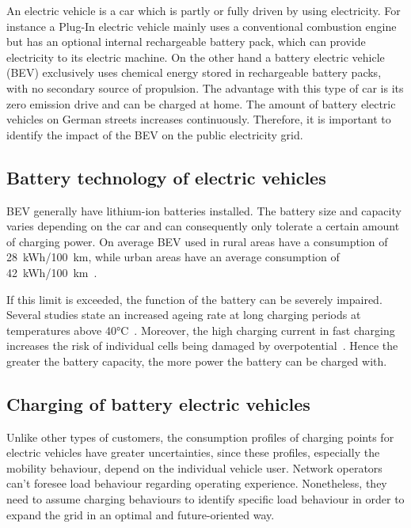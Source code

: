 An electric vehicle is a car which is partly or fully driven by using electricity. For instance a Plug-In electric vehicle mainly uses a conventional combustion engine but has an optional internal rechargeable battery pack, which can provide electricity to its electric machine. On the other hand a battery electric vehicle (BEV) exclusively uses chemical energy stored in rechargeable battery packs, with no secondary source of propulsion. The advantage with this type of car is its zero emission drive and can be charged at home. The amount of battery electric vehicles on German streets increases continuously. Therefore, it is important to identify the impact of the BEV on the public electricity grid. 

\subsection{Battery technology of electric vehicles}

BEV generally have lithium-ion batteries installed. The battery size and capacity varies depending on the car and can consequently only tolerate a certain amount of charging power. On average BEV used in rural areas have a consumption of 28~kWh/100~km, while urban areas have an average consumption of 42~kWh/100~km~\cite{VDEFNN_2021}. 

If this limit is exceeded, the function of the battery can be severely impaired. Several studies state an increased ageing rate at long charging periods at temperatures above 40°C~\cite{yang_asymmetric_2019}. Moreover, the high charging current in fast charging increases the risk of individual cells being damaged by overpotential~\cite{yang_asymmetric_2019}. Hence the greater the battery capacity, the more power the battery can be charged with. 


\subsection{Charging of battery electric vehicles}

Unlike other types of customers, the consumption profiles of charging points for electric vehicles have greater uncertainties, since these profiles, especially the mobility behaviour, depend on the individual vehicle user. Network operators can't foresee load behaviour regarding operating experience. Nonetheless, they need to assume charging behaviours to identify specific load behaviour in order to expand the grid in an optimal and future-oriented way.  


